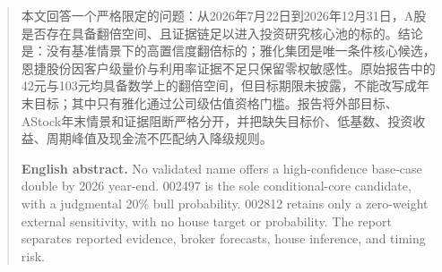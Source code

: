 \documentclass[a4paper,11pt,openany,fontset=none]{ctexrep}
\begin{document}
\astockcover
\begin{abstract}
本文回答一个严格限定的问题：从2026年7月22日到2026年12月31日，A股是否存在具备翻倍空间、且证据链足以进入投资研究核心池的标的。结论是：没有基准情景下的高置信度翻倍标的；雅化集团是唯一条件核心候选，恩捷股份因客户级量价与利用率证据不足只保留零权敏感性。原始报告中的42元与103元均具备数学上的翻倍空间，但目标期限未披露，不能改写成年末目标；其中只有雅化通过公司级估值资格门槛。报告将外部目标、AStock年末情景和证据阻断严格分开，并把缺失目标价、低基数、投资收益、周期峰值及现金流不匹配纳入降级规则。

\textbf{English abstract.} No validated name offers a high-confidence base-case double by 2026 year-end. 002497 is the sole conditional-core candidate, with a judgmental 20\% bull probability. 002812 retains only a zero-weight external sensitivity, with no house target or probability. The report separates reported evidence, broker forecasts, house inference, and timing risk.
\end{abstract}
\tableofcontents
\clearpage










\appendix



\end{document}
